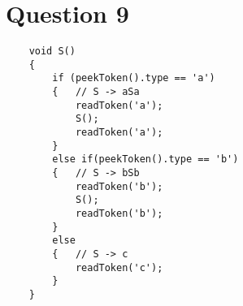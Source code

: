 \documentclass[class=article]{standalone}
\begin{document}
\section*{Question 9}

\begin{lstlisting}
    void S()
    {
        if (peekToken().type == 'a')
        {   // S -> aSa
            readToken('a');
            S();
            readToken('a');
        }
        else if(peekToken().type == 'b')
        {   // S -> bSb
            readToken('b');
            S();
            readToken('b');
        }
        else 
        {   // S -> c
            readToken('c');
        }
    }

\end{lstlisting}
\end{document}

